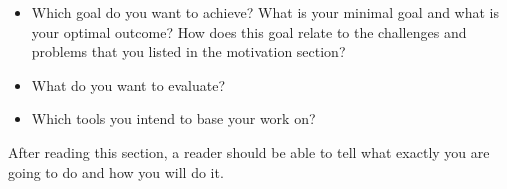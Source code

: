 \documentclass{scrartcl}
\begin{document}
 \begin{itemize}
 \item Which goal do you want to achieve? What is your minimal goal and what is your optimal outcome? How does this goal relate to the challenges and problems that you listed in the motivation section?
 \item What do you want to evaluate?
 \item Which tools you intend to base your work on?
\end{itemize}

After reading this section, a reader should be able to tell what exactly you are going to do and how you will do it.



\end{document}

